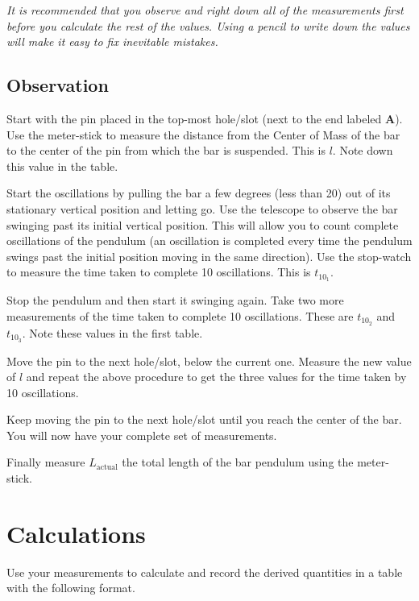 \documentclass{article}
\begin{document}
         \textit{It is recommended that you observe and right down all of the measurements first before you calculate the rest of the values. Using a pencil to write down the values will make it easy to fix inevitable mistakes.}

      \subsection*{Observation}

      Start with the pin placed in the top-most hole/slot (next to the end labeled \textbf{A}). Use the meter-stick to measure the distance from the Center of Mass of the bar to the center of the pin from which the bar is suspended. This is $l$. Note down this value in the table.

      Start the oscillations by pulling the bar a few degrees (less than 20) out of its stationary vertical position and letting go. Use the telescope to observe the bar swinging past its initial vertical position. This will allow you to count complete oscillations of the pendulum (an oscillation is completed every time the pendulum swings past the initial position moving in the same direction). Use the stop-watch to measure the time taken to complete 10 oscillations. This is $t_{10_1}$.

      Stop the pendulum and then start it swinging again. Take two more measurements of the time taken to complete 10 oscillations. These are $t_{10_2}$ and $t_{10_3}$. Note these values in the first table.

      Move the pin to the next hole/slot, below the current one. Measure the new value of $l$ and repeat the above procedure to get the three values for the time taken by 10 oscillations.

      Keep moving the pin to the next hole/slot until you reach the center of the bar. You will now have your complete set of measurements.

      Finally measure $L_\text{actual}$ the total length of the bar pendulum using the meter-stick.


   \section*{Calculations}

      Use your measurements to calculate and record the derived quantities in a table with the following format.
      
\end{document}
